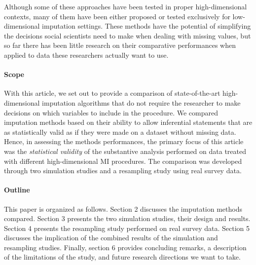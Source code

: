 Although some of these approaches have been tested in proper high-dimensional contexts, many of them have 
been either proposed or tested exclusively for low-dimensional imputation settings.
These methods have the potential of simplifying the decisions social scientists need to make when dealing 
with missing values, but so far there has been little research on their comparative performances when applied 
to data these researchers actually want to use.

\paragraph{Scope}
With this article, we set out to provide a comparison of state-of-the-art high-dimensional imputation algorithms 
that do not require the researcher to make decisions on which variables to include in the procedure.
We compared imputation methods based on their ability to allow inferential statements that are as statistically 
valid as if they were made on a dataset without missing data.
Hence, in assessing the methods performances, the primary focus of this article was the \emph{statistical validity}
\citep{rubin:1996} of the substantive analysis performed on data treated with different high-dimensional 
MI procedures.
The comparison was developed through two simulation studies and a resampling study using real survey data.

\paragraph{Outline}
This paper is organized as follows. 
Section 2 discusses the imputation methods compared.
Section 3 presents the two simulation studies, their design and results.
Section 4 presents the resampling study performed on real survey data.
Section 5 discusses the implication of the combined results of the simulation and resampling studies.
Finally, section 6 provides concluding remarks, a description of the limitations of the study, and  
future research directions we want to take.
